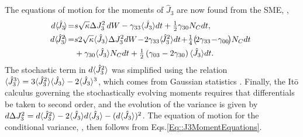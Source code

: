 \documentclass[aps,pra,twocolumn]{revtex4-1} %
\newcommand{\varz}{\Delta J_3^2}
\newcommand{\jz}{\hat{J}_3}
\begin{document}
\begin{appendix}
The equations of motion for the moments of $\jz$ are now found from the SME, ,
	\begin{subequations} \label{Eq::J3MomentEquations}
	\begin{align} 
		\!\!d \expt{\!\jz\!} \!=& s \sqrt{\kappa} \varz \, dW - \gamma_{33} \expt{\jz}dt + \smallfrac{1}{2} \gamma_{30} N_C dt ,  \\
		\!\!d \expt{\!\jz^2\!} \!=& s 2\sqrt{\kappa} \expt{\jz}\Delta J_3^2  dW \!-\! 2 \gamma_{33} \expt{\!\jz^2}dt \!+\! \smallfrac{1}{4} \big(\! 2 \gamma_{33}\!-\!\gamma_{00}\!\big) N_C dt \nn\\
		&+ \gamma_{30} \expt{\jz} N_C dt + \smallfrac{1}{2}\left(\gamma_{03} -2 \gamma_{30}\right) \expt{\jz} dt. 
	\end{align}
	\end{subequations}
The stochastic term in $d\expt{\jz^2}$ was simplified using the relation $\expt{\jz^3} = 3\expt{\jz^2}\expt{\jz}- 2\expt{\jz}^3$, which comes from Gaussian statistics \cite{jacobs_straightforward_2006}. 
Finally, the It\={o} calculus governing the stochastically evolving moments requires that differentials be taken to second order, and the evolution of the variance is given by $d \varz = d \expt{\jz^2} - 2 \expt{\jz} d \expt{\jz} - ( d \expt{\jz} )^2$. 
The equation of motion for the conditional variance, , then follows from Eqs.\eqref{Eq::J3MomentEquations}.



\end{appendix}
\end{document}
